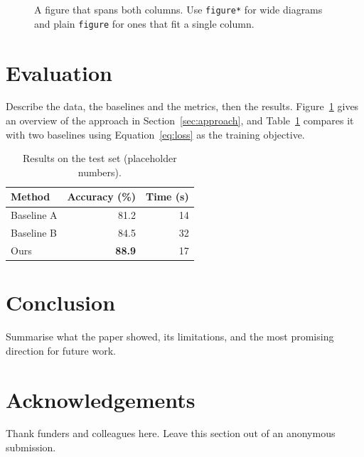 \documentclass[10pt, twocolumn]{article}
\begin{document}
\begin{figure}[t]
  \centering
  \caption{A figure that spans both columns. Use \texttt{figure*} for wide diagrams and plain \texttt{figure} for ones that fit a single column.}
  \label{fig:overview}
\end{figure}

\section{Evaluation}
\label{sec:eval}

Describe the data, the baselines and the metrics, then the results.
Figure~\ref{fig:overview} gives an overview of the approach in
Section~\ref{sec:approach}, and Table~\ref{tab:results} compares it with
two baselines using Equation~\eqref{eq:loss} as the training objective.

\begin{table}[t]
  \centering
  \small
  \begin{tabular}{lrr}
    \toprule
    Method & Accuracy (\%) & Time (s) \\
    \midrule
    Baseline A & 81.2 & 14 \\
    Baseline B & 84.5 & 32 \\
    Ours & \textbf{88.9} & 17 \\
    \bottomrule
  \end{tabular}
  \caption{Results on the test set (placeholder numbers).}
  \label{tab:results}
\end{table}

\section{Conclusion}
\label{sec:conclusion}

Summarise what the paper showed, its limitations, and the most promising
direction for future work.

\section*{Acknowledgements}

Thank funders and colleagues here. Leave this section out of an anonymous
submission.



\end{document}
